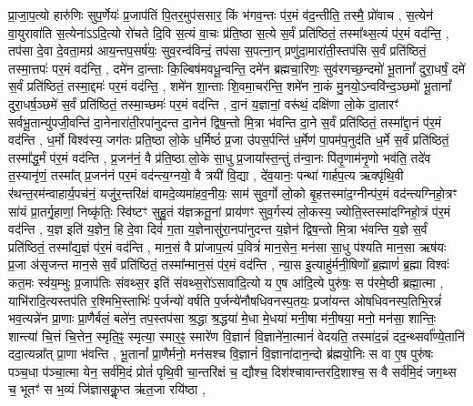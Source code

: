 प्रा॒जा॒प॒त्यो हारु॑णिः सुप॒र्णेयः॑ प्र॒जाप॑तिं पि॒तर॒मुप॑ससार॒ किं भ॑गव॒न्तः प॑र॒मं व॑द॒न्तीति॒ तस्मै॒ प्रो॑वाच \sep
स॒त्येन॑ वा॒युरावा॑ति स॒त्येना॑ऽऽदि॒त्यो रो॑चते दि॒वि स॒त्यं वा॒चः प्र॑ति॒ष्ठा स॒त्ये स॒र्वं प्रति॑ष्ठितं॒ तस्मा᳚थ्स॒त्यं प॑र॒मं वद॑न्ति॒ \sep
तप॑सा दे॒वा दे॒वता॒मग्र॑ आय॒न्तप॒सर्\mbox{}ष॑यः॒ सुव॒रन्व॑विन्दं॒ तप॑सा स॒पत्ना॒न् प्रणु॑दा॒मारा॑ती॒स्तप॑सि स॒र्वं प्रति॑ष्ठितं॒ तस्मा॒त्तपः॑ पर॒मं वद॑न्ति॒ \sep
दमे॑न दा॒न्ताः कि॒ल्बिष॑मवधू॒न्वन्ति॒ दमे॑न ब्रह्मचा॒रिणः॒ सुव॑रगच्छ॒न्दमो॑ भू॒तानां᳚ दुरा॒धर्\mbox{}षं॒ दमे॑ स॒र्वं प्रति॑ष्ठितं॒ तस्मा॒द्दमः॑ पर॒मं वद॑न्ति॒ \sep
शमे॑न शा॒न्ताः  शि॒वमा॒चर॑न्ति॒ शमे॑न ना॒कं मु॒नयो॒ऽन्ववि॑न्द॒ञ्छमो॑ भू॒तानां᳚ दुरा॒धर्\mbox{}ष॒ञ्छमे॑ स॒र्वं प्रति॑ष्ठितं॒ तस्मा॒च्छमः॑ पर॒मं वद॑न्ति \sep
दा॒नं य॒ज्ञानां॒ वरू॑थं॒ दक्षि॑णा लो॒के दा॒तारꣳ॑ सर्वभू॒तान्यु॑पजी॒वन्ति॑ दा॒नेनारा॑ती॒रपा॑नुदन्त दा॒नेन॑ द्विष॒न्तो मि॒त्रा भ॑वन्ति दा॒ने स॒र्वं प्रति॑ष्ठितं॒ तस्मा᳚द्दा॒नं प॑र॒मं वद॑न्ति \sep
ध॒र्मो विश्व॑स्य॒ जग॑तः प्रति॒ष्ठा लो॒के ध॒र्मिष्ठं॑ प्र॒जा उ॑पस॒र्पन्ति॑ ध॒र्मेण॑ पा॒पम॑प॒नुद॑ति ध॒र्मे स॒र्वं प्रति॑ष्ठितं॒ तस्मा᳚द्ध॒र्मं प॑र॒मं वद॑न्ति \sep
प्र॒जन॑नं॒ वै प्र॑ति॒ष्ठा लो॒के सा॒धु प्र॒जाया᳚स्त॒न्तुं त॑न्वा॒नः पि॑तृ॒णाम॑नृ॒णो भव॑ति॒ तदे॑व त॒स्यानृ॑णं॒ तस्मा᳚त् प्र॒जन॑नं पर॒मं वद॑न्त्य॒ग्नयो॒ वै त्रयी॑ वि॒द्या \sep
 दे॑व॒यानः॒ पन्था॑ गार्\mbox{}हप॒त्य ऋक्पृ॑थि॒वी र॑थन्त॒रम॑न्वाहार्य॒पच॑नं॒ यजु॑र॒न्तरि॑क्षं वामदे॒व्यमा॑हव॒नीयः॒ साम॑ सुव॒र्गो लो॒को बृ॒हत्तस्मा॑द॒ग्नीन्प॑र॒मं वद॑न्त्यग्निहो॒त्रꣳ सा॑यं प्रा॒तर्गृ॒हाणां॒ निष्कृ॑तिः॒ स्वि॑ष्टꣳ सुहु॒तं य॑ज्ञक्रतू॒नां प्राय॑णꣳ सुव॒र्गस्य॑ लो॒कस्य॒ ज्योति॒स्तस्मा॑दग्निहो॒त्रं प॑र॒मं वद॑न्ति \sep
 य॒ज्ञ इति॑ य॒ज्ञेन॒ हि दे॒वा दिवं॑ ग॒ता य॒ज्ञेनासु॑रा॒नपा॑नुदन्त य॒ज्ञेन॑ द्विष॒न्तो मि॒त्रा भ॑वन्ति य॒ज्ञे स॒र्वं प्रति॑ष्ठितं॒ तस्मा᳚द्य॒ज्ञं प॑र॒मं वद॑न्ति \sep 
 मान॒सं वै प्रा॑जाप॒त्यं प॒वित्रं॑ मान॒सेन॒ मन॑सा सा॒धु प॑श्यति मान॒सा ऋष॑यः प्र॒जा अ॑सृजन्त मान॒से स॒र्वं प्रति॑ष्ठितं॒ तस्मा᳚न्मान॒सं प॑र॒मं वद॑न्ति \sep
 न्या॒स इ॒त्याहु॑र्मनी॒षिणो᳚ ब्र॒ह्माणं॑ ब्र॒ह्मा विश्वः॑ कत॒मः स्व॑य॒म्भुः प्र॒जाप॑तिः संवथ्स॒र इति॑ संवथ्स॒रो॑ऽसावा॑दि॒त्यो य ए॒ष आ॑दि॒त्ये पुरु॑षः॒ स प॑रमे॒ष्ठी ब्रह्मा॒त्मा \sep
 याभि॑रादि॒त्यस्तप॑ति र॒श्मिभि॒स्ताभिः॑ प॒र्जन्यो॑ वर्\mbox{}षति प॒र्जन्ये॑नौषधिवनस्प॒तयः॒ प्रजा॑यन्त ओषधिवनस्प॒तिभि॒रन्नं॑ भव॒त्यन्ने॑न प्रा॒णाः प्रा॒णैर्बलं॒ बले॑न॒ तप॒स्तप॑सा श्र॒द्धा श्र॒द्धया॑ मे॒धा मे॒धया॑ मनी॒षा म॑नी॒षया॒ मनो॒ मन॑सा॒ शान्तिः॒ शान्त्या॑ चि॒त्तं चि॒त्तेन॒ स्मृति॒ꣴ॒ स्मृत्या॒ स्मार॒ꣴ॒ स्मारे॑ण वि॒ज्ञानं॑  वि॒ज्ञाने॑ना॒त्मानं॑ वेदयति॒ तस्मा॑द॒न्नं दद॒न्थ्सर्वा᳚ण्ये॒तानि॑ ददा॒त्यन्ना᳚त् प्रा॒णा भ॑वन्ति \sep
  भू॒तानां᳚ प्रा॒णैर्मनो॒ मन॑सश्च वि॒ज्ञानं॑  वि॒ज्ञाना॑दान॒न्दो ब्र॑ह्मयो॒निः स वा ए॒ष पुरु॑षः पञ्च॒धा प॑ञ्चा॒त्मा येन॒ सर्व॑मि॒दं प्रोतं॑ पृथि॒वी चा॒न्तरि॑क्षं च॒ द्यौश्च॒ दिश॑श्चावान्तरदि॒शाश्च॒ स वै सर्व॑मि॒दं जग॒थ्स च॒ भूतꣳ॑ स भ॒व्यं जि॑ज्ञासकॢ॒प्त ऋ॑त॒जा रयि॑ष्ठा \sep

